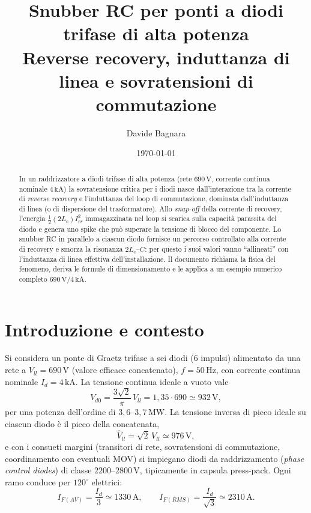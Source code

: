 \documentclass[11pt,a4paper]{article}
\title{Snubber RC per ponti a diodi trifase di alta potenza\\[2mm]
\large Reverse recovery, induttanza di linea e sovratensioni di commutazione}
\author{Davide Bagnara}
\date{\today}
\newcommand{\unit}[1]{\,\mathrm{#1}}
\begin{document}
\maketitle

\begin{abstract}
In un raddrizzatore a diodi trifase di alta potenza (rete $690\unit{V}$,
corrente continua nominale $4\unit{kA}$) la sovratensione critica per i
diodi nasce dall'interazione tra la corrente di \emph{reverse recovery} e
l'induttanza del loop di commutazione, dominata dall'induttanza di linea
(o di dispersione del trasformatore). Allo \emph{snap-off} della corrente
di recovery, l'energia $\tfrac{1}{2}(2L_c)I_{rr}^2$ immagazzinata nel loop
si scarica sulla capacit\`a parassita del diodo e genera uno spike che pu\`o
superare la tensione di blocco del componente. Lo snubber RC in parallelo a
ciascun diodo fornisce un percorso controllato alla corrente di recovery e
smorza la risonanza $2L_c$--$C$: per questo i suoi valori vanno
``allineati'' con l'induttanza di linea effettiva dell'installazione.
Il documento richiama la fisica del fenomeno, deriva le formule di
dimensionamento e le applica a un esempio numerico completo
$690\unit{V}/4\unit{kA}$.
\end{abstract}

\tableofcontents

\section{Introduzione e contesto}

Si considera un ponte di Graetz trifase a sei diodi (6 impulsi) alimentato
da una rete a $V_{ll}=690\unit{V}$ (valore efficace concatenato),
$f=50\unit{Hz}$, con corrente continua nominale $I_d = 4\unit{kA}$. La
tensione continua ideale a vuoto vale
\begin{equation}
V_{d0} = \frac{3\sqrt{2}}{\pi}\,V_{ll} = 1{,}35 \cdot 690 \simeq 932\unit{V},
\end{equation}
per una potenza dell'ordine di $3{,}6$--$3{,}7\unit{MW}$. La tensione
inversa di picco ideale su ciascun diodo \`e il picco della concatenata,
\begin{equation}
\hat{V}_{ll} = \sqrt{2}\,V_{ll} \simeq 976\unit{V},
\end{equation}
e con i consueti margini (transitori di rete, sovratensioni di
commutazione, coordinamento con eventuali MOV) si impiegano diodi da
raddrizzamento (\emph{phase control diodes}) di classe
$2200$--$2800\unit{V}$, tipicamente in capsula press-pack. Ogni ramo
conduce per $120^\circ$ elettrici:
\begin{equation}
I_{F(AV)} = \frac{I_d}{3} \simeq 1330\unit{A}, \qquad
I_{F(RMS)} = \frac{I_d}{\sqrt{3}} \simeq 2310\unit{A}.
\end{equation}
\end{document}
